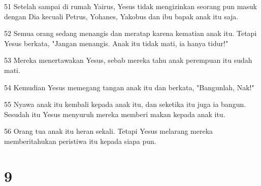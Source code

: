 \par 51 Setelah sampai di rumah Yairus, Yesus tidak mengizinkan seorang pun masuk dengan Dia kecuali Petrus, Yohanes, Yakobus dan ibu bapak anak itu saja.
\par 52 Semua orang sedang menangis dan meratap karena kematian anak itu. Tetapi Yesus berkata, "Jangan menangis. Anak itu tidak mati, ia hanya tidur!"
\par 53 Mereka menertawakan Yesus, sebab mereka tahu anak perempuan itu sudah mati.
\par 54 Kemudian Yesus memegang tangan anak itu dan berkata, "Bangunlah, Nak!"
\par 55 Nyawa anak itu kembali kepada anak itu, dan seketika itu juga ia bangun. Sesudah itu Yesus menyuruh mereka memberi makan kepada anak itu.
\par 56 Orang tua anak itu heran sekali. Tetapi Yesus melarang mereka memberitahukan peristiwa itu kepada siapa pun.

\chapter{9}


